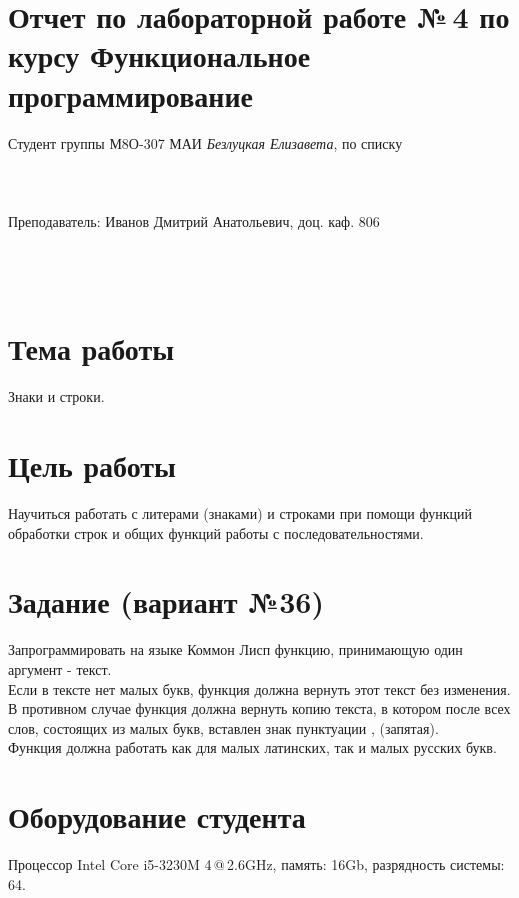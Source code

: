 \documentclass[12pt]{article}
\begin{document}
\section*{Отчет по лабораторной работе №\,4 
по курсу \guillemotleft  Функциональное программирование\guillemotright}
\begin{flushright}
Студент группы М8О-307 МАИ \textit{Безлуцкая Елизавета},  по списку \\
 \\
 \\
\ \\
Преподаватель: Иванов Дмитрий Анатольевич, доц. каф. 806 \\
 \\
 \\
 \\

\end{flushright}

\section{Тема работы}
Знаки и строки.

\section{Цель работы}
Научиться работать с литерами (знаками) и строками при помощи функций обработки строк и общих функций работы с последовательностями.

\section{Задание (вариант №36)}
Запрограммировать на языке Коммон Лисп функцию, принимающую один аргумент - текст.\\

Если в тексте нет малых букв, функция должна вернуть этот текст без изменения. В противном случае функция должна вернуть копию текста, в котором после всех слов, состоящих из малых букв, вставлен знак пунктуации , (запятая).\\

Функция должна работать как для малых латинских, так и малых русских букв.

\section{Оборудование студента}
Процессор Intel Core i5-3230M 4\,@\,2.6GHz, память: 16Gb, разрядность системы: 64.
\end{document}
